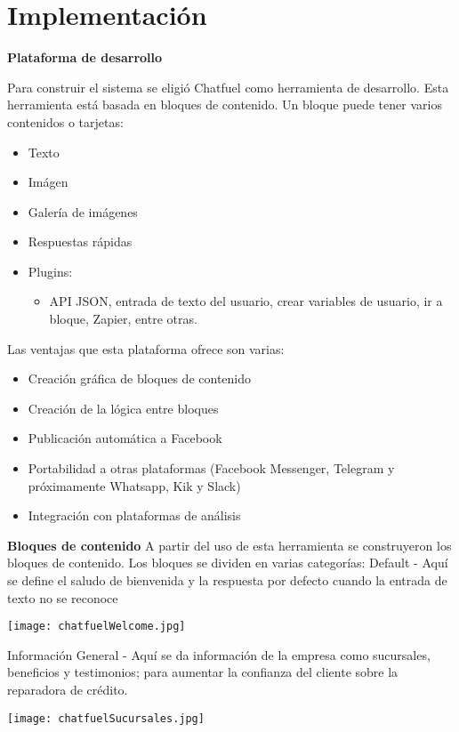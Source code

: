\chapter{Implementación}

\textbf{Plataforma de desarrollo}

Para construir el sistema se eligió Chatfuel \cite{sarinho2017splimbo} como herramienta de desarrollo. Esta herramienta está basada en bloques de contenido. Un bloque puede tener varios contenidos o tarjetas:
\begin{itemize}
\item Texto
\item Imágen
\item Galería de imágenes
\item Respuestas rápidas
\item Plugins:
\begin{itemize}
	\item API JSON, entrada de texto del usuario, crear variables de usuario, ir a bloque, Zapier, entre otras.
\end{itemize}
\end{itemize}

Las ventajas que esta plataforma ofrece son varias:
\begin{itemize}
\item Creación gráfica de bloques de contenido
\item Creación de la lógica entre bloques
\item Publicación automática a Facebook
\item Portabilidad a otras plataformas (Facebook Messenger, Telegram y próximamente Whatsapp, Kik y Slack)
\item Integración con plataformas de análisis
\end{itemize}

\textbf{Bloques de contenido}
A partir del uso de esta herramienta se construyeron los bloques de contenido. Los bloques se dividen en varias categorías:
Default - Aquí se define el saludo de bienvenida y la respuesta por defecto cuando la entrada de texto no se reconoce

\texttt{[image: chatfuelWelcome.jpg]}

Información General -  Aquí se da información de la empresa como sucursales, beneficios y testimonios; para aumentar la confianza del cliente sobre la reparadora de crédito.

\texttt{[image: chatfuelSucursales.jpg]}

